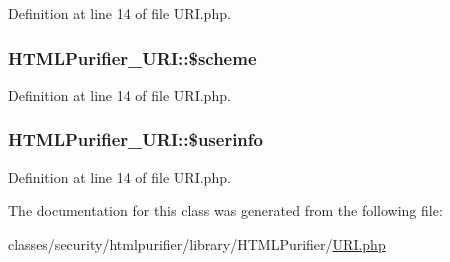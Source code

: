 Definition at line 14 of file U\+R\+I.\+php.

\hypertarget{classHTMLPurifier__URI_a6e035d8cdd9fa94b370cfe3f8aad5ccf}{
\subsubsection[{\$scheme}]{\setlength{\rightskip}{0pt plus 5cm}H\+T\+M\+L\+Purifier\+\_\+\+U\+R\+I\+::\$scheme}}\label{classHTMLPurifier__URI_a6e035d8cdd9fa94b370cfe3f8aad5ccf}


Definition at line 14 of file U\+R\+I.\+php.

\hypertarget{classHTMLPurifier__URI_accbbb68c8c8694d1af0449e2a78816c9}{
\subsubsection[{\$userinfo}]{\setlength{\rightskip}{0pt plus 5cm}H\+T\+M\+L\+Purifier\+\_\+\+U\+R\+I\+::\$userinfo}}\label{classHTMLPurifier__URI_accbbb68c8c8694d1af0449e2a78816c9}


Definition at line 14 of file U\+R\+I.\+php.



The documentation for this class was generated from the following file\+:\begin{DoxyCompactItemize}
\item 
classes/security/htmlpurifier/library/\+H\+T\+M\+L\+Purifier/\hyperlink{URI_8php}{U\+R\+I.\+php}\end{DoxyCompactItemize}
